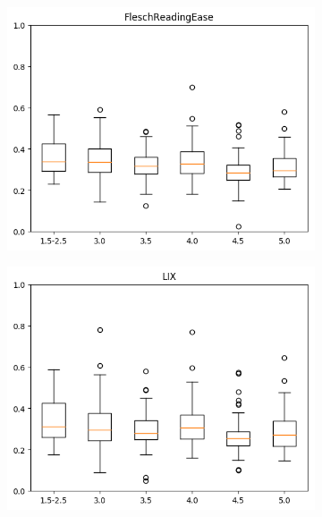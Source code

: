 \documentclass[12pt,journal,compsoc]{IEEEtran}
\begin{document}
\begin{figure}[H]
\centering
\begin{subfigure}{0.27\textwidth}
\includegraphics[scale=0.41]{../unigrams/scripts/boxplots/FleschReadingEase.png}
\end{subfigure} \hspace{0.05\textwidth}
\begin{subfigure}{0.27\textwidth}
\includegraphics[scale=0.41]{../unigrams/scripts/boxplots/LIX.png}
\end{subfigure} \hspace{0.05\textwidth}
\begin{subfigure}{0.27\textwidth}

\end{subfigure}
\end{figure}
\end{document}
